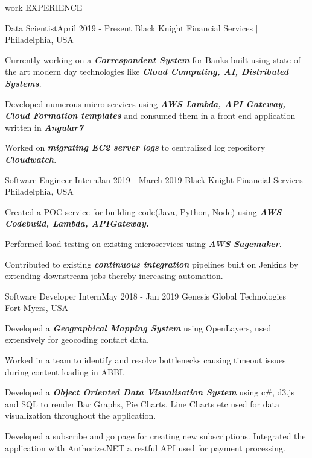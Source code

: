 \documentclass{resume} %
\begin{document}
\begin{rSection}{work EXPERIENCE}


\begin{rSubsection}{Data Scientist}{April 2019 - Present} {Black Knight Financial Services $|$ Philadelphia, USA} {}
\item Currently working on a \textbf{\textit{Correspondent System}} for Banks built using state of the art modern day technologies like \textbf{\textit{Cloud Computing, AI, Distributed Systems}}.
\item Developed numerous micro-services using \textbf{\textit{AWS Lambda, API Gateway, Cloud Formation templates}} and consumed them in a front end application written in \textbf{\textit{Angular7}}
\item Worked on \textbf{\textit{migrating EC2 server logs}} to centralized log repository \textbf{\textit{Cloudwatch}}.
\end{rSubsection}


\begin{rSubsection}{Software Engineer Intern}{Jan 2019 - March 2019} {Black Knight Financial Services $|$ Philadelphia, USA} {}
\item Created a POC service for building code(Java, Python, Node) using \textbf{\textit{AWS Codebuild, Lambda, APIGateway.}}
\item Performed load testing on existing microservices using \textbf{\textit{AWS Sagemaker}}.
\item Contributed to existing \textbf{\textit{continuous integration}} pipelines built on Jenkins by extending downstream jobs thereby increasing automation.
\end{rSubsection}

\begin{rSubsection}{Software Developer Intern}{May 2018 - Jan 2019} {Genesis Global Technologies $|$ Fort Myers, USA} {}
\item Developed a \textbf{\textit{Geographical Mapping System}} using OpenLayers, used extensively for geocoding contact data.
\item Worked in a team to identify and resolve bottlenecks causing timeout issues during content loading in ABBI. 
\item Developed a \textbf{\textit{Object Oriented Data Visualisation System}} using c\#, d3.js and SQL to render Bar Graphs, Pie Charts, Line Charts etc used for data visualization throughout the application.
\item Developed a subscribe and go page for creating new subscriptions. Integrated the application with Authorize.NET a restful API used for payment processing.
\end{rSubsection}


\end{rSection}
\end{document}
